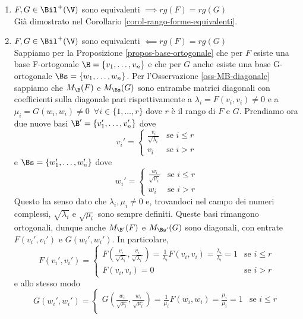 \documentclass[11pt, a4paper, titlepage, oneside]{scrbook}
\begin{document}
\Dimostrazione \nopagebreak

\begin{enumerate}[label=\arabic*°]
    \item $F,G \in \Bil^+(\V)$ sono equivalenti $\implies rg(F) = rg(G)$ \\
    Già dimostrato nel Corollario \ref{corol-rango-forme-equivalenti}.
    \item $F,G \in \Bil^+(\V)$ sono equivalenti $\impliedby rg(F) = rg(G)$ \\
    Sappiamo per la Proposizione \ref{propos-base-ortogonale} che per $F$ esiste una base F-ortogonale $\B = \{v_1, \ldots, v_n\}$ e che per $G$ anche esiste una base G-ortogonale $\Bs = \{w_1, \ldots, w_n\}$. Per l'Osservazione \ref{oss-MB-diagonale} sappiamo che $M_\B(F)$ e $M_\Bs(G)$ sono entrambe matrici diagonali con coefficienti sulla diagonale pari rispettivamente a $\lambda_i = F(v_i,v_i) \neq 0$ e a $\mu_i = G(w_i,w_i) \neq 0 \enspace \forall i \in \{1, \ldots, r\}$ dove $r$ è il rango di $F$ e $G$. Prendiamo ora due nuove basi $\B' = \{v_1', \ldots, v_n'\}$ dove
    \[
    v_i' =
    \begin{cases}
    \frac{v_i}{\sqrt{\lambda_i}} & \text{se } i \leq r \\
    v_i & \text{se } i > r 
    \end{cases}
    \]
    e $\Bs = \{w_1', \ldots, w_n'\}$ dove
    \[
    w_i' =
    \begin{cases}
    \frac{w_i}{\sqrt{\mu_i}} & \text{se } i \leq r\\
    w_i & \text{se } i > r 
    \end{cases}
    \]
    Questo ha senso dato che $\lambda_i, \mu_i \neq 0$ e, trovandoci nel campo dei numeri complessi, $\sqrt{\lambda_i}$ e $\sqrt{\mu_i}$ sono sempre definiti. Queste basi rimangono ortogonali, dunque anche $M_{\B'}(F)$ e $M_{\Bs'}(G)$ sono diagonali, con entrate $F(v_i',v_i')$ e $G(w_i',w_i')$. In particolare,
    \[
    F(v_i', v_i') = 
    \begin{cases}
    F(\frac{v_i}{\sqrt{\lambda_i}}, \frac{v_i}{\sqrt{\lambda_i}}) = \frac{1}{\lambda_i} F(v_i,v_i) = \frac{\lambda_i}{\lambda_i} = 1 & \text{se } i \leq r\\
    F(v_i, v_i) = 0 & \text{se } i > r 
    \end{cases}
    \]
    e allo stesso modo
    \[
    G(w_i', w_i') = 
    \begin{cases}
    G(\frac{w_i}{\sqrt{\mu_i}}, \frac{w_i}{\sqrt{\mu_i}}) = \frac{1}{\mu_i} F(w_i,w_i) = \frac{\mu_i}{\mu_i} = 1 & \text{se } i \leq r\\

\end{cases}\]
\end{enumerate}
\end{document}
